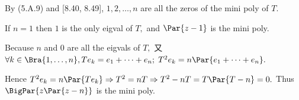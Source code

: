 By (5.A.9) and [8.40, 8.49], $1,2,\dots,n$ are all the zeros of the mini poly of $T.$\PfEnd
\SepLine

\par\quad
If $n=1$ then $1$ is the only eigval of $T,$ and $\Par{z-1}$ is the mini poly.\par\quad
Because $n$ and $0$ are all the eigvals of $T,$ 又 $\forall k\in\Bra{1,\dots,n},T e_k=e_1+\dots+e_n;\;T^2 e_k=n \Par{e_1+\dots+e_n}.$\par\quad
Hence $T^2 e_k=n\Par{T e_k}\Rightarrow T^2=n T\Rightarrow T^2-n T=T\Par{T-n}=0.$ Thus $\BigPar{z\Par{z-n}}$ is the mini poly.\PfEnd
\SepLine

